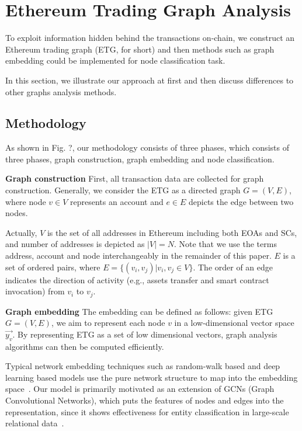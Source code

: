 
\section{Ethereum Trading Graph Analysis}
To exploit information hidden behind the transactions on-chain, we construct an Ethereum trading graph (ETG, for short) and then  methods such as graph embedding could be implemented for node classification task.

In this section, we illustrate our approach at first and then discuss differences to other graphs analysis methods.

\subsection{Methodology}
\label{subsec:methodology}
As shown in Fig. ?, our methodology consists of three phases, which consists of three phases, graph construction, graph embedding and node classification. 

\textbf{Graph construction}
First, all transaction data are collected for graph construction. Generally, we consider the ETG as a directed graph $G=(V,E)$, where node $v \in V$ represents an account and $e \in E$ depicts the edge between two nodes. 

Actually, $V$ is the set of all addresses in Ethereum including both EOAs and SCs, and number of addresses is depicted as $|V|=N$. Note that we use the terms address, account and node interchangeably in the remainder of this paper. $E$ is a set of ordered pairs, where $E=\{(v_i,v_j)|v_i,v_j \in V\}$. The order of an edge indicates the direction of activity (e.g., assets transfer and smart contract invocation) from $v_i$ to $v_j$. %



\textbf{Graph embedding}
The embedding can be defined as follows: given ETG $G=(V,E)$, we aim to represent each node $v$ in a low-dimensional vector space $\vec{y_v}$. By representing ETG as a set of low dimensional vectors, graph analysis algorithms can then be computed efficiently. 

Typical network embedding techniques such as random-walk based and deep learning based models use the pure network structure to map into the embedding space~\cite{goyal2018capturing}. Our model is primarily motivated as an extension of GCNs (Graph Convolutional Networks), which puts the features of nodes and edges into the representation, since it shows effectiveness for entity classification in large-scale relational data~\cite{kipf2016semi}.

